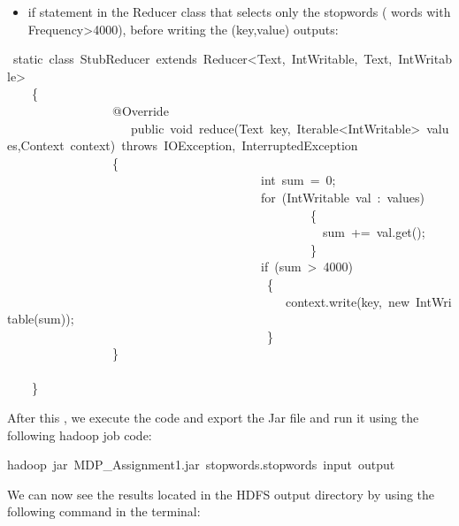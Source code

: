 \documentclass{article}
\begin{document}
\begin{itemize}[noitemsep,topsep=\mdcompacttopsep]%

\item if statement in the Reducer class that selects only the stopwords ( words with Frequency\textgreater{}4000),
before writing the (key,value) outputs:%
\end{itemize}%
\begin{mdpre}%
~{static}~{class}~StubReducer~{extends}~Reducer\textless{}Text,~IntWritable,~Text,~IntWritable\textgreater{}\\
~~~~\{\\
~~~~~~~~~~~~~~~~~@Override\\
~~~~~~~~~~~~~~~~~~~~{public}~{void}~reduce(Text~key,~Iterable\textless{}IntWritable\textgreater{}~values,Context~context)~{throws}~IOException,~InterruptedException~\\
~~~~~~~~~~~~~~~~~\{\\
~~~~~~~~~~~~~~~~~~~~~~~~~~~~~~~~~~~~~~~~~{int}~sum~=~{0};\\
~~~~~~~~~~~~~~~~~~~~~~~~~~~~~~~~~~~~~~~~~{for}~(IntWritable~val~:~values)~\\
~~~~~~~~~~~~~~~~~~~~~~~~~~~~~~~~~~~~~~~~~~~~~~~~~\{\\
~~~~~~~~~~~~~~~~~~~~~~~~~~~~~~~~~~~~~~~~~~~~~~~~~~~sum~+=~val.get();\\
~~~~~~~~~~~~~~~~~~~~~~~~~~~~~~~~~~~~~~~~~~~~~~~~~\}\\
~~~~~~~~~~~~~~~~~~~~~~~~~~~~~~~~~~~~~~~~~{if}~(sum~\textgreater{}~{4000})~\\
~~~~~~~~~~~~~~~~~~~~~~~~~~~~~~~~~~~~~~~~~~\{\\
~~~~~~~~~~~~~~~~~~~~~~~~~~~~~~~~~~~~~~~~~~~~~context.write(key,~{new}~IntWritable(sum));\\
~~~~~~~~~~~~~~~~~~~~~~~~~~~~~~~~~~~~~~~~~~\}\\
~~~~~~~~~~~~~~~~~\}\\
\\
~~~~\}%
\end{mdpre}\noindent After this , we execute the code and export the Jar file and run it using the following hadoop job code:
\begin{mdpre}%
\noindent hadoop~jar~MDP\_Assignment1.jar~stopwords.stopwords~input~output%
\end{mdpre}\noindent We can now see the results located in the HDFS output directory by using the following command in the terminal:
\end{document}
